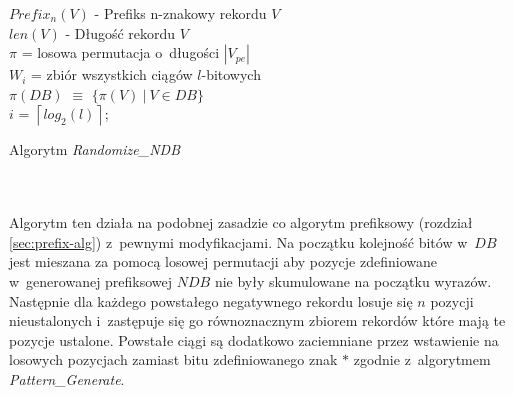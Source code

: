 \begin{algorithm}[H]
    \SetAlgoLined
    $Prefix_n(V)$ - Prefiks n-znakowy rekordu $V$\\
    $len(V)$ - Długość rekordu $V$\\
    $\pi$ = losowa permutacja o~długości $|V_{pe}|$\\
    $W_i$ = zbiór wszystkich ciągów $l$-bitowych\\
    $\pi(DB)$ $\equiv$ $\{\pi(V) ~|~ V \in DB\}$\\
    $i$ = $\left \lceil{log_2(l)}\right \rceil$;\\
    \caption{Algorytm \textit{Randomize\_NDB}}
    \label{alg:randomize}
\end{algorithm}
~\\\\
Algorytm ten działa na podobnej zasadzie co algorytm prefiksowy (rozdział \ref{sec:prefix-alg}) z~pewnymi modyfikacjami.
Na początku kolejność bitów w~$DB$ jest mieszana za pomocą losowej permutacji aby pozycje zdefiniowane w~generowanej prefiksowej $NDB$ nie były skumulowane na początku wyrazów. Następnie dla każdego powstałego negatywnego rekordu losuje się $n$ pozycji nieustalonych i~zastępuje się go równoznacznym zbiorem rekordów które mają te pozycje ustalone. 
Powstałe ciągi są dodatkowo zaciemniane przez wstawienie na losowych pozycjach zamiast bitu zdefiniowanego znak $*$ zgodnie z~algorytmem \textit{Pattern\_Generate}.

